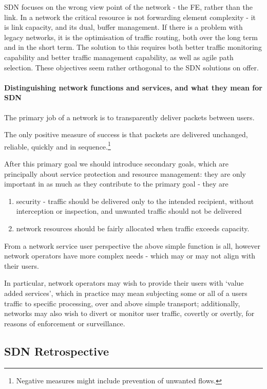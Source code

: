 SDN focuses on the wrong view point of the network - the FE, rather than the link.
In a network the critical resource is not forwarding element complexity - it is link capacity, and its dual, buffer management.
If there is a problem with legacy networks, it is the optimisation of traffic routing, both over the long term and in the short term.
The solution to this requires both better traffic monitoring capability and better traffic management capability, as well as agile path selection.
These objectives seem rather orthogonal to the SDN solutions on offer.

\paragraph{Distinguishing network functions and services, and what they mean for SDN
}

The primary job of a network is to transparently deliver packets between users.

The only positive measure of success is that packets are delivered unchanged, reliable, quickly and in sequence.\footnote{Negative measures might include prevention of unwanted flows.}

After this primary goal we should introduce secondary goals, which are principally about service protection and resource management: they are only important in as much as they contribute to the primary goal - they are

\begin{enumerate}
    \item security - traffic should be delivered only to the intended recipient, without interception or inspection, and unwanted traffic should not be delivered
    \item network resources should be fairly allocated when traffic exceeds capacity.
\end{enumerate}

From a network service user perspective the above simple function is all, however network operators have more complex needs - which may or may not align with their users.

In particular, network operators may wish to provide their users with ‘value added services’, which in practice may mean subjecting some or all of a users traffic to specific processing, over and above simple transport; additionally, networks may also wish to divert or monitor user traffic, covertly or overtly, for reasons of enforcement or surveillance.


\subsection{SDN Retrospective}


